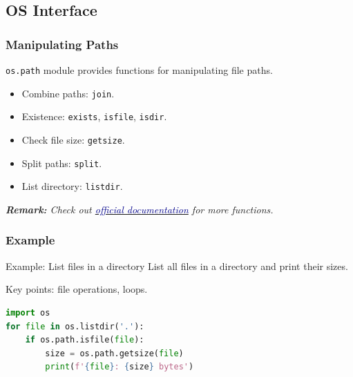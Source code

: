 \documentclass[beamer, en, version=2.0]{huangfusl-template}
\begin{document}
    \subsection{OS Interface}
    \begin{frame}[fragile]
        \frametitle{Manipulating Paths}

        {\footnotesize\verb|os.path|} module provides functions for manipulating file paths.

        \begin{itemize}
            \item Combine paths: {\footnotesize\verb|join|}.
            \item Existence: {\footnotesize\verb|exists|}, {\footnotesize\verb|isfile|}, {\footnotesize\verb|isdir|}.
            \item Check file size: {\footnotesize\verb|getsize|}.
            \item Split paths: {\footnotesize\verb|split|}.
            \item List directory: {\footnotesize\verb|listdir|}.
        \end{itemize}

        {\footnotesize\itshape\textbf{Remark:} Check out \href{https://docs.python.org/3/library/os.path.html}{\textcolor{darkblue}{official documentation}} for more functions.}
    \end{frame}
    \begin{frame}[fragile]
        \frametitle{Example}

        \begin{block}{Example: List files in a directory}
            List all files in a directory and print their sizes.
        \end{block}

        Key points: file operations, loops.

        \pause

\begin{lstlisting}[language=python]
import os
for file in os.listdir('.'):
    if os.path.isfile(file):
        size = os.path.getsize(file)
        print(f'{file}: {size} bytes')
\end{lstlisting}
    \end{frame}
\end{document}

